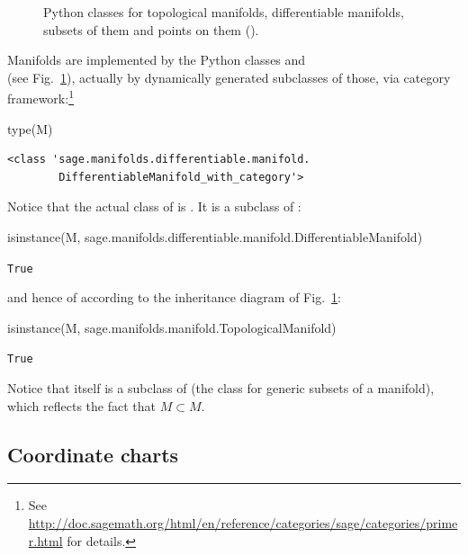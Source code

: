 \begin{figure}
\begin{center}

\end{center}
\caption{\label{f:man:domain_classes}\footnotesize
Python classes for topological
manifolds, differentiable manifolds, subsets of them
and points on them ().}
\end{figure}


Manifolds are implemented by the Python classes 
and \\  (see Fig.~\ref{f:man:domain_classes}),
actually by dynamically generated subclasses of those, via \Sage{} category
framework:\footnote{See \url{http://doc.sagemath.org/html/en/reference/categories/sage/categories/primer.html} for details.}
\begin{NBin}
type(M)
\end{NBin}
\begin{NBout}
\begin{verbatim}
<class 'sage.manifolds.differentiable.manifold.
        DifferentiableManifold_with_category'>
\end{verbatim}
\end{NBout}
Notice that the actual class of  is .
It is a subclass of :
\begin{NBin}
isinstance(M,
           sage.manifolds.differentiable.manifold.DifferentiableManifold)
\end{NBin}
\begin{NBout}
\texttt{True}
\end{NBout}
and hence of
 according to the inheritance diagram of Fig.~\ref{f:man:domain_classes}:
\begin{NBin}
isinstance(M, sage.manifolds.manifold.TopologicalManifold)
\end{NBin}
\begin{NBout}
\texttt{True}
\end{NBout}
Notice that  itself is a subclass of  (the class
for generic subsets of a manifold), which reflects the fact that $M\subset M$.

\subsection{Coordinate charts} \label{s:man:coord_chart}

